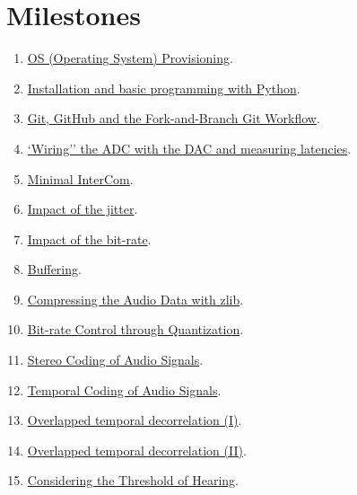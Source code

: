 \section{Milestones}
\begin{enumerate}
\item \href{https://tecnologias-multimedia.github.io/study_guide/01-provisioning/}{OS (Operating System) Provisioning}.
\item \href{https://tecnologias-multimedia.github.io/study_guide/02-python/}{Installation and basic programming with Python}.
\item \href{https://tecnologias-multimedia.github.io/study_guide/03-git/}{Git, GitHub and the Fork-and-Branch Git Workflow}.
\item \href{https://tecnologias-multimedia.github.io/study_guide/04-wiring/}{`Wiring'' the ADC with the DAC and measuring latencies}.
\item \href{https://tecnologias-multimedia.github.io/study_guide/05-minimal/}{Minimal InterCom}.
\item \href{https://tecnologias-multimedia.github.io/study_guide/06-jitter_impact/}{Impact of the jitter}.
\item \href{https://tecnologias-multimedia.github.io/study_guide/07-bit-rate_impact/}{Impact of the bit-rate}.
\item \href{https://tecnologias-multimedia.github.io/study_guide/08-buffering/}{Buffering}.
\item \href{https://tecnologias-multimedia.github.io/study_guide/09-compress/}{Compressing the Audio Data with zlib}.
\item \href{https://tecnologias-multimedia.github.io/study_guide/10-bt_control/}{Bit-rate Control through Quantization}.
\item \href{https://tecnologias-multimedia.github.io/study_guide/11-stereo_coding/}{Stereo Coding of Audio Signals}.
\item \href{https://tecnologias-multimedia.github.io/study_guide/12-temporal_coding/}{Temporal Coding of Audio Signals}.
\item \href{https://tecnologias-multimedia.github.io/study_guide/13-overlapped_temporal_decorrelation_I/}{Overlapped temporal decorrelation (I)}.
\item \href{https://tecnologias-multimedia.github.io/study_guide/14-overlapped_temporal_decorrelation_II/}{Overlapped temporal decorrelation (II)}.
\item \href{https://tecnologias-multimedia.github.io/study_guide/15-threshold/}{Considering the Threshold of Hearing}.
\end{enumerate}

